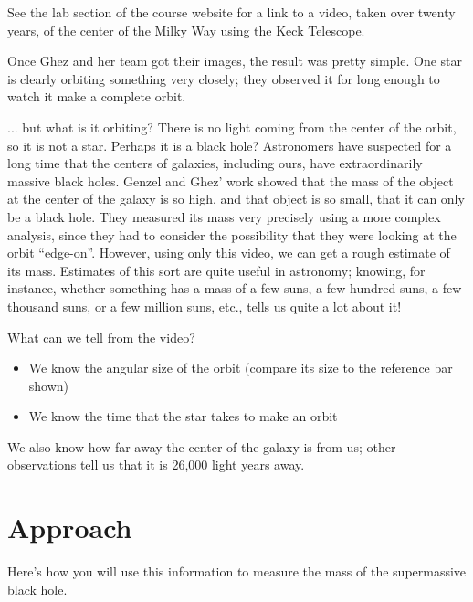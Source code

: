 \documentclass[11pt]{article}
\begin{document}
See the lab section of the course website for a link to a video, taken over twenty years, of the center of the Milky Way using the Keck Telescope.

Once Ghez and her team got their images, the result was pretty simple. One star is clearly orbiting something very closely; they observed it for long enough to watch it make a complete orbit. 

... but what is it orbiting? There is no light coming from the center of the orbit, so it is not a star. Perhaps it is a black hole? Astronomers have suspected for a long time that the centers of galaxies, including ours, have extraordinarily massive black holes. Genzel and Ghez’ work showed that the mass of the object at the center of the galaxy is so high, and that object is so small, that it can only be a black hole. They measured its mass very precisely using a more complex analysis, since they had to consider the possibility that they were looking at the orbit ``edge-on''. However, using only this video, we can get a rough estimate of its mass. Estimates of this sort are quite useful in astronomy; knowing, for instance, whether something has a mass of a few suns, a few hundred suns, a few thousand suns, or a few million suns, etc., tells us quite a lot about it!
\vspace{0.5in}

What can we tell from the video?

\begin{itemize}
\item We know the angular size of the orbit (compare its size to the reference bar shown)
\item We know the time that the star takes to make an orbit 
\end{itemize}

We also know how far away the center of the galaxy is from us; other observations tell us that it is 26,000 light years away.


\section{Approach}

Here’s how you will use this information to measure the mass of the supermassive black hole.
\end{document}
